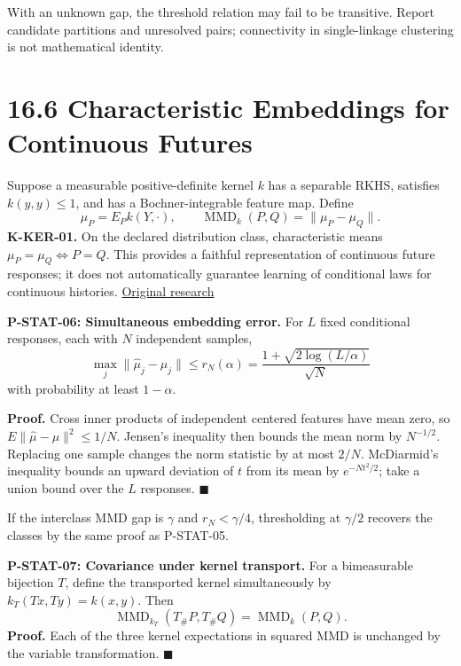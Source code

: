 \documentclass[
  english,
  11pt,
  oneside]{book}
\begin{document}
With an unknown gap, the threshold relation may fail to be transitive. Report candidate partitions and unresolved pairs; connectivity in single-linkage clustering is not mathematical identity.

\section{16.6 Characteristic Embeddings for Continuous Futures}\label{characteristic-embeddings-for-continuous-futures}

Suppose a measurable positive-definite kernel \(k\) has a separable RKHS, satisfies \(k(y,y)\le1\), and has a Bochner-integrable feature map. Define \[\mu_P=E_Pk(Y,\cdot),\qquad
\operatorname{MMD}_k(P,Q)=\|\mu_P-\mu_Q\|.\] \textbf{K-KER-01.} On the declared distribution class, characteristic means \(\mu_P=\mu_Q\iff P=Q\). This provides a faithful representation of continuous future responses; it does not automatically guarantee learning of conditional laws for continuous histories. \href{https://www.jmlr.org/papers/volume13/gretton12a/gretton12a.pdf}{Original research}

\hypertarget{p-stat-06}{}\label{p-stat-06}

\textbf{P-STAT-06: Simultaneous embedding error.} For \(L\) fixed conditional responses, each with \(N\) independent samples, \[\max_j\|\widehat\mu_j-\mu_j\|
\le r_N(\alpha)=
\frac{1+\sqrt{2\log(L/\alpha)}}{\sqrt N}\] with probability at least \(1-\alpha\).

\textbf{Proof.} Cross inner products of independent centered features have mean zero, so \(E\|\widehat\mu-\mu\|^2\le1/N\). Jensen's inequality then bounds the mean norm by \(N^{-1/2}\). Replacing one sample changes the norm statistic by at most \(2/N\). McDiarmid's inequality bounds an upward deviation of \(t\) from its mean by \(e^{-Nt^2/2}\); take a union bound over the \(L\) responses. \(\blacksquare\)

If the interclass MMD gap is \(\gamma\) and \(r_N<\gamma/4\), thresholding at \(\gamma/2\) recovers the classes by the same proof as P-STAT-05.

\hypertarget{p-stat-07}{}\label{p-stat-07}

\textbf{P-STAT-07: Covariance under kernel transport.} For a bimeasurable bijection \(T\), define the transported kernel simultaneously by \(k_T(Tx,Ty)=k(x,y)\). Then \[\operatorname{MMD}_{k_T}(T_\#P,T_\#Q)
=\operatorname{MMD}_k(P,Q).\] \textbf{Proof.} Each of the three kernel expectations in squared MMD is unchanged by the variable transformation. \(\blacksquare\)
\end{document}
